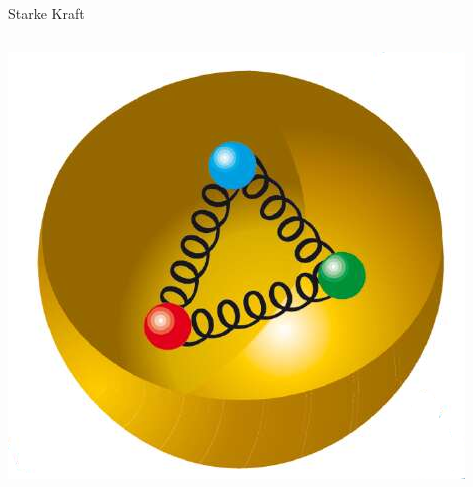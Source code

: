 \documentclass{beamer}
\begin{document}
\begin{frame}
\begin{block}{Starke Kraft}
\begin{columns}[T]
\begin{column}{0.3\textwidth}
        \includegraphics[height=0.22\textheight]{matter/Proton.png}
      \end{column}
    \end{columns}
  \end{block}
\end{frame}
\end{document}
